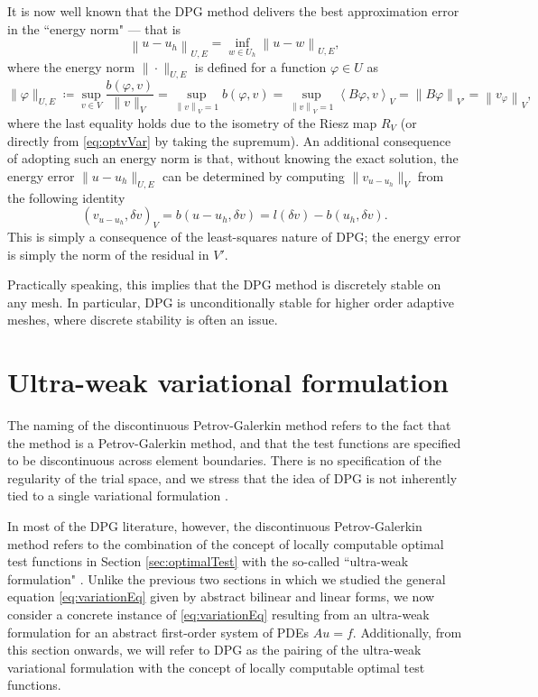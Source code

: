 \documentclass{report}
\newcommand{\eqnlab}[1]{\label{eq:#1}}
\newcommand{\eqnref}[1]{\eqref{eq:#1}}
\newcommand{\seclab}[1]{\label{sec:#1}}
\newcommand{\secref}[1]{\ref{sec:#1}}
\newcommand{\nor}[1]{\left\| #1 \right\|}
\newcommand{\LRp}[1]{\left( #1 \right)}
\newcommand{\LRa}[1]{\left\langle #1 \right\rangle}
\begin{document}
It is now well known that the DPG method
delivers the best approximation error in the ``energy norm" --- that is
\cite{Bui-ThanhDemkowiczGhattas11a, DPG2,DPG4} 
\begin{equation}
\eqnlab{optimalError}
\nor{u-u_h}_{U,E} = \inf_{w\in U_h} \nor{u-w}_{U,E},
\end{equation}
where the energy norm $\|\cdot \|_{U,E}$ is defined for a function $\varphi \in U$ as
\begin{equation}
\eqnlab{energyNorm} \|\varphi\|_{U,E} \coloneqq \sup_{v\in V}
\frac{b(\varphi,v)}{\|v\|_V} = \sup_{\nor{v}_V = 1} b(\varphi,v) =
\sup_{\nor{v}_V = 1} \LRa{B\varphi,v}_V = \nor{B\varphi}_{V'} =
\nor{v_\varphi}_V,
\end{equation}
where the last equality holds due to the isometry of the Riesz map
$R_V$ (or directly from \eqnref{optvVar} by taking the supremum). An
additional consequence of adopting such an energy norm is that,
without knowing the exact solution, the energy error $\|u-u_h\|_{U,E}$ can
be determined by computing $\|v_{u-u_h}\|_V$ from the following
identity
\[
\left(v_{u-u_h},\delta v\right)_V = b(u-u_h,\delta v) = l\LRp{\delta
v} - b(u_h,\delta v).
\]
This is simply a consequence of the least-squares nature of DPG; the energy error is simply the norm of the  residual in $V'$. 

Practically speaking, this implies that the DPG method is discretely stable on any mesh. In particular, DPG is unconditionally stable for higher order adaptive meshes, where discrete stability is often an issue. 

\section{Ultra-weak variational formulation}
\seclab{abstractUweak}

The naming of the discontinuous Petrov-Galerkin method refers to the fact that the method is a Petrov-Galerkin method, and that the test functions are specified to be discontinuous across element boundaries. There is no specification of the regularity of the trial space, and we stress that the idea of DPG is not inherently tied to a single variational formulation \cite{Bui-ThanhDemkowiczGhattas11a}. 

In most of the DPG literature, however, the discontinuous Petrov-Galerkin method refers to the combination of the concept of locally computable optimal test functions in Section \secref{optimalTest} with the so-called ``ultra-weak formulation" \cite{DPG1,DPG2,DPG3,DPG4,DPGElas,DBLP:journals/procedia/NiemiCC11}. Unlike the previous two sections in which we studied the general equation \eqnref{variationEq} given by abstract bilinear and linear forms, we now consider a concrete instance of \eqnref{variationEq} resulting from an ultra-weak formulation for an abstract first-order system of PDEs $Au = f$. Additionally, from this section onwards, we will refer to DPG as the pairing of the ultra-weak variational formulation with the concept of locally computable optimal test functions. 
\end{document}
